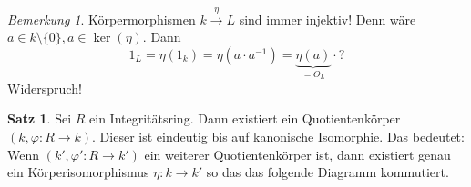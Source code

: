 \documentclass[12pt,parskip=full]{scrartcl}
\theoremstyle{definition}
\newtheorem{theorem}{Satz}[section]
\theoremstyle{remark}
\newtheorem*{remark}{Bemerkung}
\begin{document}
	\begin{remark}
		Körpermorphismen $k \overset{\eta}{\to} L$ sind immer injektiv! Denn wäre $a \in k \setminus \{0\}, a \in \ker(\eta)$. Dann
		\begin{equation*}
			1_L = \eta(1_k) = \eta(a \cdot a^{-1}) = \underbrace{\eta(a)}_{= O_L} \cdot ?
		\end{equation*} 
		Widerspruch!
	\end{remark}

	\begin{theorem}
		Sei $R$ ein Integritätsring. Dann existiert ein Quotientenkörper $(k, \varphi: R \to k)$. Dieser ist eindeutig bis auf kanonische Isomorphie. Das bedeutet: Wenn $(k', \varphi': R \to k')$ ein weiterer Quotientenkörper ist, dann existiert genau ein Körperisomorphismus $\eta: k \to k'$ so das das folgende Diagramm kommutiert.
		
		\begin{center}
		\end{center}
	\end{theorem}
\end{document}
